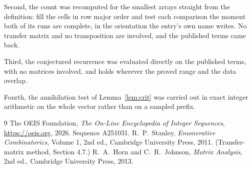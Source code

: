\documentclass[11pt,a4paper]{article}
\theoremstyle{plain}
\theoremstyle{definition}
\begin{document}
Second, the count was recomputed for the smallest arrays straight from the definition: fill the
cells in row major order and test each comparison the moment both of its runs are complete,
in the orientation the entry's own name writes. No transfer matrix and no transposition are
involved, and the published terms came back.

Third, the conjectured recurrence was evaluated directly on the published terms, with no
matrices involved, and holds wherever the proved range and the data overlap.

Fourth, the annihilation test of Lemma~\ref{lem:crit} was carried out in exact integer
arithmetic on the whole vector rather than on a sampled prefix.

\begin{thebibliography}{9}
 The OEIS Foundation, \emph{The On-Line Encyclopedia of Integer
Sequences}, \url{https://oeis.org}, 2026. Sequence A251031.
 R.~P.~Stanley, \emph{Enumerative Combinatorics}, Volume 1, 2nd ed.,
Cambridge University Press, 2011. (Transfer-matrix method, Section 4.7.)
 R.~A.~Horn and C.~R.~Johnson, \emph{Matrix Analysis}, 2nd ed., Cambridge
University Press, 2013.
\end{thebibliography}
\end{document}
